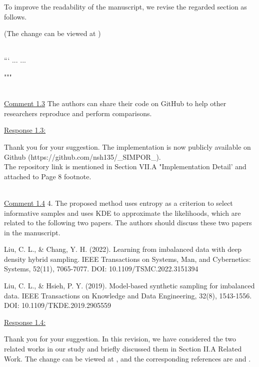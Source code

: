 To improve the readability of the manuscript, we revise the regarded section as follows.

\colorbox{marygold}{(The change can be viewed at )}\\~
  
  
```
...
...

"""



~\\
\color{blue}
\underline{Comment 1.3}
The authors can share their code on GitHub to help other researchers reproduce and perform comparisons.

\color{black}
\underline{Response 1.3:}

Thank you for your suggestion. The implementation is now publicly available on Github (https://github.com/nsh135/\_SIMPOR\_). \\
\colorbox{marygold}{The repository link is mentioned in Section VII.A "Implementation Detail' and attached to Page 8 footnote. }  


~\\
\color{blue}
\underline{Comment 1.4}
4. The proposed method uses entropy as a criterion to select informative samples and uses KDE to approximate the likelihoods, which are related to the following two papers. The authors should discuss these two papers in the manuscript.


Liu, C. L., \& Chang, Y. H. (2022). Learning from imbalanced data with deep density hybrid sampling. IEEE Transactions on Systems, Man, and Cybernetics: Systems, 52(11), 7065-7077. DOI: 10.1109/TSMC.2022.3151394

Liu, C. L., \& Hsieh, P. Y. (2019). Model-based synthetic sampling for imbalanced data. IEEE Transactions on Knowledge and Data Engineering, 32(8), 1543-1556. DOI: 10.1109/TKDE.2019.2905559


\color{black}
\underline{Response 1.4:}

Thank you for your suggestion. In this revision, we have considered the two related works in our study and briefly discussed them in Section II.A Related Work. \colorbox{marygold}{The change can be viewed at , and the corresponding references are \cite{9723474} and \cite{8668459}}.


